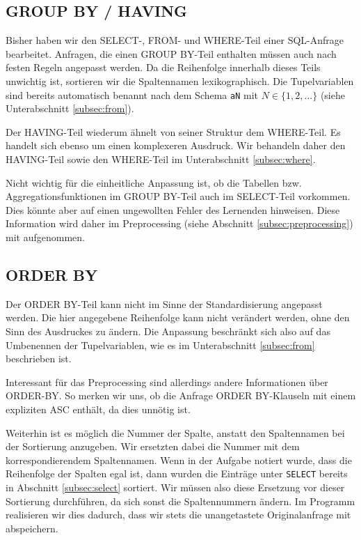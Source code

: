 \subsection{GROUP BY / HAVING}

Bisher haben wir den SELECT-, FROM- und WHERE-Teil einer SQL-Anfrage bearbeitet. Anfragen, die einen GROUP BY-Teil enthalten müssen auch nach festen Regeln angepasst werden. Da die Reihenfolge innerhalb dieses Teils unwichtig ist, sortieren wir die Spaltennamen lexikographisch. Die Tupelvariablen sind bereits automatisch benannt nach dem Schema \verb|aN| mit $N\in \{1,2,...\}$ (siehe Unterabschnitt \ref{subsec:from}).

Der HAVING-Teil wiederum ähnelt von seiner Struktur dem WHERE-Teil. Es handelt sich ebenso um einen komplexeren Ausdruck. Wir behandeln daher den HAVING-Teil sowie den WHERE-Teil im Unterabschnitt \ref{subsec:where}.

Nicht wichtig für die einheitliche Anpassung ist, ob die Tabellen bzw. Aggregationsfunktionen im GROUP BY-Teil auch im SELECT-Teil vorkommen. Dies könnte aber auf einen ungewollten Fehler des Lernenden hinweisen. Diese Information wird daher im Preprocessing (siehe Abschnitt \ref{subsec:preprocessing}) mit aufgenommen. 

\subsection{ORDER BY}

Der ORDER BY-Teil kann nicht im Sinne der Standardisierung angepasst werden. Die hier angegebene Reihenfolge kann nicht verändert werden, ohne den Sinn des Ausdruckes zu ändern. Die Anpassung beschränkt sich also auf das Umbenennen der Tupelvariablen, wie es im Unterabschnitt \ref{subsec:from} beschrieben ist.

Interessant für das Preprocessing sind allerdings andere Informationen über ORDER-BY. So merken wir uns, ob die Anfrage ORDER BY-Klauseln mit einem expliziten ASC enthält, da dies unnötig ist.

Weiterhin ist es möglich die Nummer der Spalte, anstatt den Spaltennamen bei der Sortierung anzugeben. Wir ersetzten dabei die Nummer mit dem korrespondierendem Spaltennamen. Wenn in der Aufgabe notiert wurde, dass die Reihenfolge der Spalten egal ist, dann wurden die Einträge unter \verb|SELECT| bereits in Abschnitt \ref{subsec:select} sortiert. Wir müssen also diese Ersetzung vor dieser Sortierung durchführen, da sich sonst die Spaltennummern ändern. Im Programm realisieren wir dies dadurch, dass wir stets die unangetastete Originalanfrage mit abspeichern.

